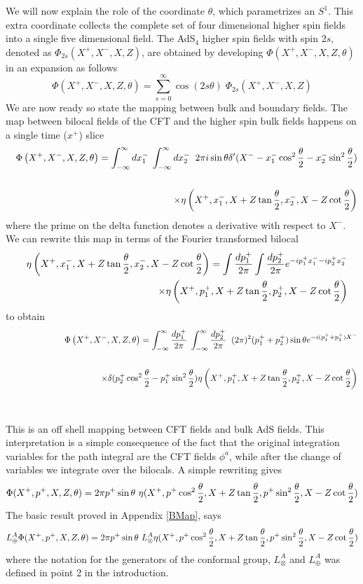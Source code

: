 \documentclass[a4paper,12pt]{article}
\def\bea{\begin{eqnarray}}
\def\eea{\end{eqnarray}}
\begin{document}
We will now explain the role of the coordinate $\theta$, which parametrizes an $S^1$.
This extra coordinate collects the complete set of four dimensional higher spin fields into a single five dimensional field.
The AdS$_4$ higher spin fields with spin $2s$, denoted as $\Phi_{2s}(X^+,X^-,X,Z)$, are obtained by developing 
$\Phi(X^+,X^-,X,Z,\theta)$ in an expansion as follows
%
\begin{equation}
\Phi(X^+,X^-,X,Z,\theta)=\sum_{s=0}^\infty\cos (2s\theta) \;\Phi_{2s}(X^+,X^-,X,Z)
\end{equation}
%
We are now ready so state the mapping between bulk and boundary fields.
The map between bilocal fields of the CFT and the higher spin bulk fields happens on a single time ($x^+$) slice
%
\begin{eqnarray}
&&\Phi\left(X^+,X^-,X,Z,\theta\right)=\int_{-\infty}^\infty dx_1^- \;\int_{-\infty}^\infty dx_2^-\; \; 2\pi i\sin\theta
\delta' (X^- -x_1^- \cos^2\frac{\theta}{2}-x_2^- \sin^2\frac{\theta}{2})\cr\cr
&&\qquad\qquad\qquad\qquad\qquad\times \eta\left(X^+,x_1^-,X+Z\tan {\theta\over2},
x_2^-,X-Z\cot{\theta\over 2}\right)
\end{eqnarray}
%
where the prime on the delta function denotes a derivative with respect to $X^-$.
We can rewrite this map in terms of the Fourier transformed bilocal
%
\begin{eqnarray}
&&\eta\left(X^+,x_1^-,X+Z\tan {\theta\over2},x_2^-,X-Z\cot{\theta\over 2}\right)
=\int {dp_1^+\over 2\pi}\int {dp_2^+\over 2\pi}e^{-ip^+_1 x_1^--ip^+_2 x_2^-}\cr
&&\qquad\qquad\qquad\qquad\qquad\times
\eta\left(X^+,p_1^+,X+Z\tan {\theta\over2},p_2^+,X-Z\cot{\theta\over 2}\right)
\end{eqnarray}
%
to obtain
%
\begin{eqnarray}
&&\Phi\left(X^+,X^-,X,Z,\theta\right)=\int_{-\infty}^\infty {dp_1^+\over 2\pi} \;\int_{-\infty}^\infty {dp_2^+\over 2\pi}
\; \; (2\pi)^2 (p_1^++p_2^+)\sin\theta e^{-i(p_1^++p_2^+)X^-}
\cr\cr
&&\qquad\qquad\qquad\qquad\qquad\times \delta (p_2^+\cos^2 {\theta\over 2}-p_1^+\sin^2 {\theta\over 2})\eta\left(X^+,p_1^+,X+Z\tan {\theta\over2},
p_2^+,X-Z\cot{\theta\over 2}\right)\cr\cr\label{niceJ}
&&
\end{eqnarray}
%
This is an off shell mapping between CFT fields and bulk AdS fields.
This interpretation is a simple consequence of the fact that the original integration variables for the path integral are the 
CFT fields $\phi^a$, while after the change of variables we integrate over the bilocals.
A simple rewriting gives
%
\bea
\Phi(X^+,p^+,X,Z,\theta) = 2\pi p^+\sin\theta\,\, 
\eta(X^+, p^+\cos^2{\theta\over 2},X+Z \tan{\theta\over 2},p^+\sin^2{\theta\over 2},X-Z\cot {\theta \over 2})\cr
\eea
%
The basic result proved in Appendix \ref{BMap}, says
%
\bea
L^A_{\oplus}\Phi(X^+,p^+,X,Z,\theta) = 2\pi p^+\sin\theta\,\, L^A_{\otimes} 
\eta(X^+, p^+\cos^2{\theta\over 2},X+Z \tan{\theta\over 2},p^+\sin^2{\theta\over 2},X-Z\cot {\theta \over 2})\cr
\eea
%
where the notation for the generators of the conformal group, $L^A_{\otimes}$ and $L^A_{\oplus}$ was defined in point
2 in the introduction.
\end{document}
